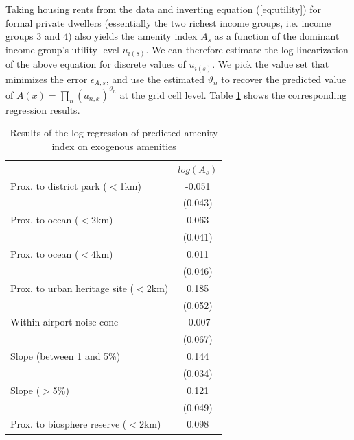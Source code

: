 \documentclass[12pt]{article}
\begin{document}
Taking housing rents from the data and inverting equation (\ref{eq:utility}) for formal private dwellers (essentially the two richest income groups, i.e. income groups 3 and 4) also yields the amenity index $A_s$ as a function of the dominant income group's utility level $u_{i(s)}$. We can therefore estimate the log-linearization of the above equation for discrete values of $u_{i(s)}$. We pick the value set that minimizes the error $\epsilon_{A,s}$, and use the estimated $\vartheta_n$ to recover the predicted value of $A(x)=\prod\limits_{n}(a_{n,x})^{\vartheta_n}$ at the grid cell level. Table \ref{tab_reg_amenities} shows the corresponding regression results.

\begin{table}[htbp!]
\centering
\caption{Results of the log regression of predicted amenity index on exogenous amenities}
\label{tab_reg_amenities}
\begin{tabular}{ll}
\cline{1-2}
\multicolumn{1}{c}{}&
\multicolumn{1}{c}{$log(A_s)$}\\
\cline{1-2}
\multicolumn{1}{l}{Prox. to district park ($<$1km)}&
\multicolumn{1}{c}{-0.051}\\
\multicolumn{1}{c}{}&
\multicolumn{1}{c}{(0.043)}\\
\multicolumn{1}{l}{Prox. to ocean ($<$2km)}&
\multicolumn{1}{c}{0.063}\\
\multicolumn{1}{c}{}&
\multicolumn{1}{c}{(0.041)}\\
\multicolumn{1}{l}{Prox. to ocean ($<$4km)}&
\multicolumn{1}{c}{0.011}\\
\multicolumn{1}{c}{}&
\multicolumn{1}{c}{(0.046)}\\
\multicolumn{1}{l}{Prox. to urban heritage site ($<$2km)}&
\multicolumn{1}{c}{0.185}\\
\multicolumn{1}{c}{}&
\multicolumn{1}{c}{(0.052)}\\
\multicolumn{1}{l}{Within airport noise cone}&
\multicolumn{1}{c}{-0.007}\\
\multicolumn{1}{c}{}&
\multicolumn{1}{c}{(0.067)}\\
\multicolumn{1}{l}{Slope (between 1 and 5\%)}&
\multicolumn{1}{c}{0.144}\\
\multicolumn{1}{c}{}&
\multicolumn{1}{c}{(0.034)}\\
\multicolumn{1}{l}{Slope ($>$5\%)}&
\multicolumn{1}{c}{0.121}\\
\multicolumn{1}{c}{}&
\multicolumn{1}{c}{(0.049)}\\
\multicolumn{1}{l}{Prox. to biosphere reserve ($<$2km)}&
\multicolumn{1}{c}{0.098}\\

\end{tabular}
\end{table}
\end{document}
